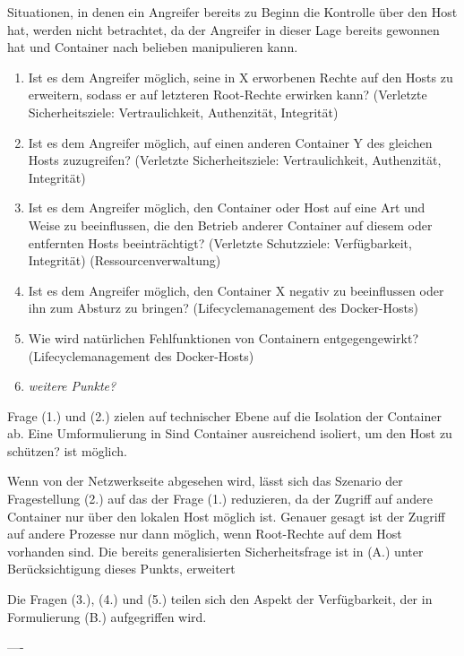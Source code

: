 \documentclass[../main.tex]{subfiles}
\begin{document}
  Situationen, in denen ein Angreifer bereits zu Beginn die Kontrolle über den Host hat, werden nicht betrachtet, da der Angreifer in dieser Lage bereits gewonnen hat und Container nach belieben manipulieren kann.

  \begin{enumerate}[(1)]
    \item Ist es dem Angreifer möglich, seine in X erworbenen Rechte auf den Hosts zu erweitern, sodass er auf letzteren Root-Rechte erwirken kann? (Verletzte Sicherheitsziele: Vertraulichkeit, Authenzität, Integrität)
    \item Ist es dem Angreifer möglich, auf einen anderen Container Y des gleichen Hosts zuzugreifen? (Verletzte Sicherheitsziele: Vertraulichkeit, Authenzität, Integrität)
    \item Ist es dem Angreifer möglich, den Container oder Host auf eine Art und Weise zu beeinflussen, die den Betrieb anderer Container auf diesem oder entfernten Hosts beeinträchtigt? (Verletzte Schutzziele: Verfügbarkeit, Integrität) (Ressourcenverwaltung)
    \item Ist es dem Angreifer möglich, den Container X negativ zu beeinflussen oder ihn zum Absturz zu bringen? (Lifecyclemanagement des Docker-Hosts)
    \item Wie wird natürlichen Fehlfunktionen von Containern entgegengewirkt? (Lifecyclemanagement des Docker-Hosts)
    \item \emph{weitere Punkte?}
  \end{enumerate}

  Frage (1.) und (2.) zielen auf technischer Ebene auf die Isolation der Container ab. Eine Umformulierung in \glqq{}Sind Container ausreichend isoliert, um den Host zu schützen?\grqq{} ist möglich.

  Wenn von der Netzwerkseite abgesehen wird, lässt sich das Szenario der Fragestellung (2.) auf das der Frage (1.) reduzieren, da der Zugriff auf andere Container nur über den lokalen Host möglich ist. Genauer gesagt ist der Zugriff auf andere Prozesse nur dann möglich, wenn Root-Rechte auf dem Host vorhanden sind. Die bereits generalisierten Sicherheitsfrage ist in (A.) unter Berücksichtigung dieses Punkts, erweitert

  Die Fragen (3.), (4.) und (5.) teilen sich den Aspekt der Verfügbarkeit, der in Formulierung (B.) aufgegriffen wird.

  ----
\end{document}
